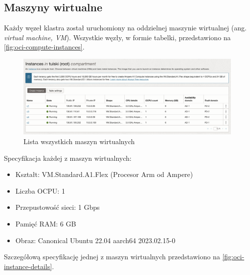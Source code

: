\subsection{Maszyny wirtualne}

Każdy węzeł klastra został uruchomiony na oddzielnej maszynie wirtualnej (ang. \emph{virtual machine, VM}).
Wszystkie węzły, w formie tabelki, przedstawiono na \autoref{fig:oci-compute-instances}.

\begin{figure}[H]
    \centering
    \includegraphics[width=\textwidth]{img/oci-compute-instances}
    \caption{Lista wszystkich maszyn wirtualnych}
    \label{fig:oci-compute-instances}
\end{figure}

\noindent Specyfikacja każdej z maszyn wirtualnych:
\begin{itemize}
    \item Kształt: VM.Standard.A1.Flex (Procesor Arm od Ampere)
    \item Liczba OCPU: 1
    \item Przepustowość sieci: 1 Gbps
    \item Pamięć RAM: 6 GB
    \item Obraz: Canonical Ubuntu 22.04 aarch64 2023.02.15-0
\end{itemize}

\noindent Szczegółową specyfikację jednej z maszyn wirtualnych przedstawiono na \autoref{fig:oci-instance-details}.

